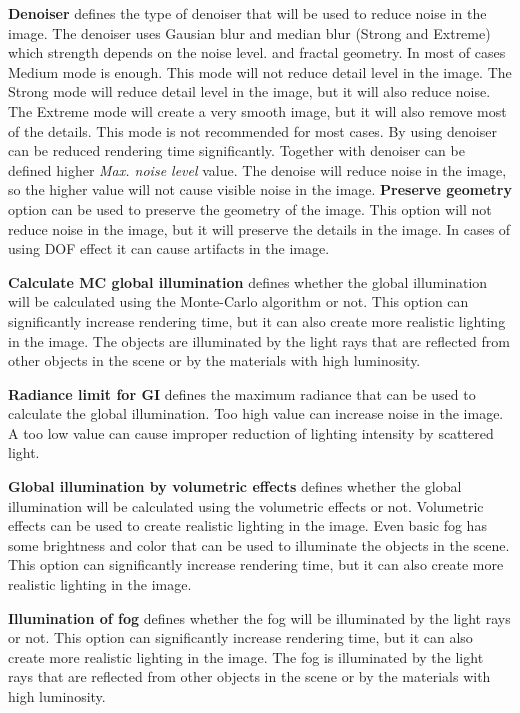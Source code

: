 \textbf{Denoiser} defines the type of denoiser that will be used to reduce noise in the image. The denoiser uses Gausian blur and median blur (Strong and Extreme) which strength depends on the noise level. and fractal geometry. In most of cases Medium mode is enough. This mode will not reduce detail level in the image. The Strong mode will reduce detail level in the image, but it will also reduce noise. The Extreme mode will create a very smooth image, but it will also remove most of the details. This mode is not recommended for most cases.
By using denoiser can be reduced rendering time significantly. Together with denoiser can be defined higher \emph{Max. noise level} value. The denoise will reduce noise in the image, so the higher value will not cause visible noise in the image.
\textbf{Preserve geometry} option can be used to preserve the geometry of the image. This option will not reduce noise in the image, but it will preserve the details in the image. In cases of using DOF effect it can cause artifacts in the image.

\textbf{Calculate MC global illumination} defines whether the global illumination will be calculated using the Monte-Carlo algorithm or not. This option can significantly increase rendering time, but it can also create more realistic lighting in the image. The objects are illuminated by the light rays that are reflected from other objects in the scene or by the materials with high luminosity.

\textbf{Radiance limit for GI} defines the maximum radiance that can be used to calculate the global illumination. Too high value can increase noise in the image. A too low value can cause improper reduction of lighting intensity by scattered light.

\textbf{Global illumination by volumetric effects} defines whether the global illumination will be calculated using the volumetric effects or not. Volumetric effects can be used to create realistic lighting in the image. Even basic fog has some brightness and color that can be used to illuminate the objects in the scene. This option can significantly increase rendering time, but it can also create more realistic lighting in the image. 

\textbf{Illumination of fog} defines whether the fog will be illuminated by the light rays or not. This option can significantly increase rendering time, but it can also create more realistic lighting in the image. The fog is illuminated by the light rays that are reflected from other objects in the scene or by the materials with high luminosity. 

